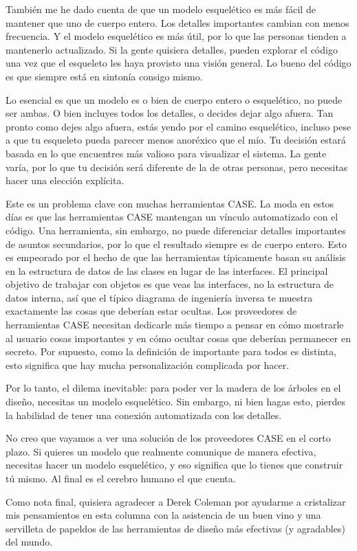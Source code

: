 \documentclass[twocolumn]{article}
\begin{document}
También me he dado cuenta de que un modelo esquelético es más fácil de mantener que uno de cuerpo entero. Los detalles importantes cambian con menos frecuencia. Y el modelo esquelético es más útil, por lo que las personas tienden a mantenerlo actualizado. Si la gente quisiera detalles, pueden explorar el código una vez que el esqueleto les haya provisto una visión general. Lo bueno del código es que siempre está en sintonía consigo mismo.

Lo esencial es que un modelo es o bien de cuerpo entero o esquelético, no puede ser ambas. O bien incluyes todos los detalles, o decides dejar algo afuera. Tan pronto como dejes algo afuera, estás yendo por el camino esquelético, incluso pese a que tu esqueleto pueda parecer menos anoréxico que el mío. Tu decisión estará basada en lo que encuentres más valioso para visualizar el sistema. La gente varía, por lo que tu decisión será diferente de la de otras personas, pero necesitas hacer una elección explícita.

Este es un problema clave con muchas herramientas CASE. La moda en estos días es que las herramientas CASE mantengan un vínculo automatizado con el código. Una herramienta, sin embargo, no puede diferenciar detalles importantes de asuntos secundarios, por lo que el resultado siempre es de cuerpo entero. Esto es empeorado por el hecho de que las herramientas típicamente basan su análisis en la estructura de datos de las clases en lugar de las interfaces. El principal objetivo de trabajar con objetos es que veas las interfaces, no la estructura de datos interna, así que el típico diagrama de ingeniería inversa te muestra exactamente las cosas que deberían estar ocultas. Los proveedores de herramientas CASE necesitan dedicarle más tiempo a pensar en cómo mostrarle al usuario cosas importantes y en cómo ocultar cosas que deberían permanecer en secreto. Por supuesto, como la definición de importante para todos es distinta, esto significa que hay mucha personalización complicada por hacer.

Por lo tanto, el dilema inevitable: para poder ver la madera de los árboles en el diseño, necesitas un modelo esquelético. Sin embargo, ni bien hagas esto, pierdes la habilidad de tener una conexión automatizada con los detalles.

No creo que vayamos a ver una solución de los proveedores CASE en el corto plazo. Si quieres un modelo que realmente comunique de manera efectiva, necesitas hacer un modelo esquelético, y eso significa que lo tienes que construir tú mismo. Al final es el cerebro humano el que cuenta.

Como nota final, quisiera agradecer a Derek Coleman por ayudarme a cristalizar mis pensamientos en esta columna con la asistencia de un buen vino y una servilleta de papel\textemdash dos de las herramientas de diseño más efectivas (y agradables) del mundo.
\end{document}
